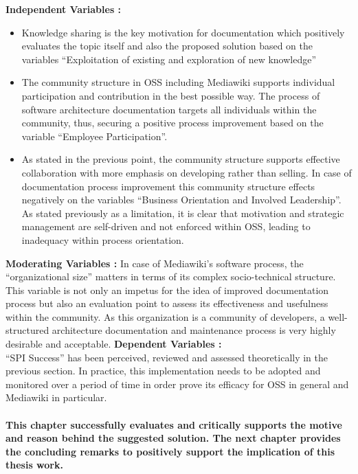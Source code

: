 \textbf{Independent Variables : } 
\begin{itemize}
\item Knowledge sharing is the key motivation for documentation which positively evaluates the topic itself and also the proposed solution based on the variables \enquote{Exploitation of existing and exploration of new knowledge}
\item The community structure in OSS including Mediawiki supports individual participation and contribution in the best possible way. The process of software architecture documentation targets all individuals within the community, thus, securing a positive process improvement based on the variable \enquote{Employee Participation}.
\item As stated in the previous point, the community structure supports effective collaboration with more emphasis on developing rather than selling. In case of documentation process improvement this community structure effects negatively on the variables \enquote{Business Orientation and Involved Leadership}. As stated previously as a limitation, it is clear that motivation and strategic management are self-driven and not enforced within OSS, leading to inadequacy within process orientation.
\end{itemize}

\textbf{Moderating Variables : }
\newline\newline
\indent In case of Mediawiki's software process, the \enquote{organizational size} matters in terms of its complex socio-technical structure. This variable is not only an impetus for the idea of improved documentation process but also an evaluation point to assess its effectiveness and usefulness within the community. As this organization is a community of developers, a well-structured architecture documentation and maintenance process is very highly desirable and acceptable.
\newline
\newline
\indent\textbf{Dependent Variables : }
\newline \\\indent\enquote{SPI Success} has been perceived, reviewed and assessed theoretically in the previous section. In practice, this implementation needs to be adopted and monitored over a period of time in order prove its efficacy for OSS in general and Mediawiki in particular.


\paragraph{This chapter successfully evaluates and critically supports the motive and reason behind the suggested solution. The next chapter provides the concluding remarks to positively support the implication of this thesis work.}
